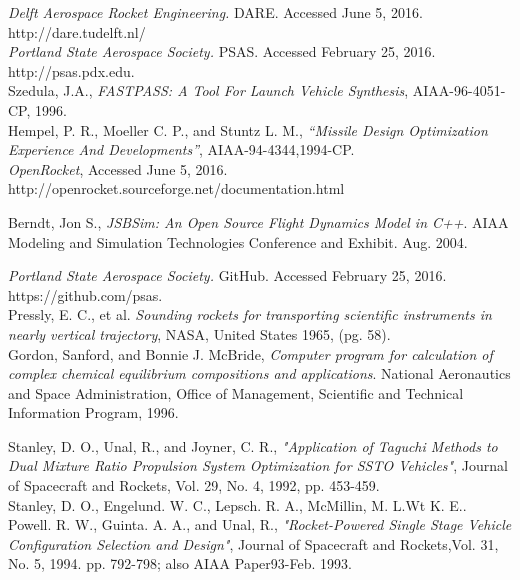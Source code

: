 \documentclass[]{aiaa-tc}%
\begin{document}
\begin{thebibliography}{9}%
{\it Delft Aerospace Rocket Engineering.} DARE. Accessed June 5, 2016. http://dare.tudelft.nl/\\

{\it Portland State Aerospace Society.} PSAS. Accessed February 25, 2016. http://psas.pdx.edu.\\

Szedula, J.A., {\it FASTPASS: A Tool For Launch Vehicle Synthesis}, AIAA-96-4051-CP, 1996.\\

Hempel, P. R., Moeller C. P., and Stuntz L. M., {\it “Missile Design Optimization Experience And Developments”}, AIAA-94-4344,1994-CP.\\

{\it OpenRocket}, Accessed June 5, 2016. http://openrocket.sourceforge.net/documentation.html

Berndt, Jon S., {\it JSBSim: An Open Source Flight Dynamics Model in C++}. AIAA Modeling and Simulation Technologies Conference and Exhibit. Aug. 2004.

{\it Portland State Aerospace Society.} GitHub. Accessed February 25, 2016. https://github.com/psas.\\

Pressly, E. C., et al. {\it Sounding rockets for transporting scientific instruments in nearly vertical trajectory}, NASA, United States 1965, (pg. 58).\\

Gordon, Sanford, and Bonnie J. McBride, {\it Computer program for calculation of complex chemical equilibrium compositions and applications}. National Aeronautics and Space Administration, Office of Management, Scientific and Technical Information Program, 1996.

Stanley, D. O., Unal, R., and Joyner, C. R., {\it "Application of Taguchi Methods to Dual Mixture Ratio Propulsion System Optimization for SSTO Vehicles"}, Journal of Spacecraft and Rockets, Vol. 29, No. 4, 1992, pp. 453-459.\\

Stanley, D. O., Engelund. W. C., Lepsch. R. A., McMillin, M. L.Wt K. E.. Powell. R. W., Guinta. A. A., and Unal, R., {\it "Rocket-Powered Single Stage Vehicle Configuration Selection and Design"}, Journal of Spacecraft and Rockets,Vol. 31, No. 5, 1994. pp. 792-798; also AIAA Paper93-Feb. 1993.\\


\end{thebibliography}
\end{document}
